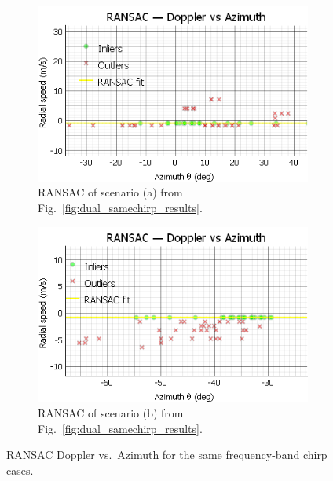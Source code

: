 \begin{figure}[!htbp]
    \centering
    \begin{subfigure}{0.48\linewidth}
        \includegraphics[width=\linewidth]{images/DualSensorSameConfigRansac.png}
        \caption{RANSAC of scenario (a) from Fig.~\ref{fig:dual_samechirp_results}.}
        \label{fig:dual_samechirp_ransac_vehicle}
    \end{subfigure}
    \hfill
    \begin{subfigure}{0.48\linewidth}
        \includegraphics[width=\linewidth]{images/DualSensorSameConfigPersonRansac.png}
        \caption{RANSAC of scenario (b) from Fig.~\ref{fig:dual_samechirp_results}.}
        \label{fig:dual_samechirp_ransac_person}
    \end{subfigure}
    \caption{RANSAC Doppler vs.\ Azimuth for the same frequency-band chirp cases.}
    \label{fig:dual_samechirp_ransac}
\end{figure}

